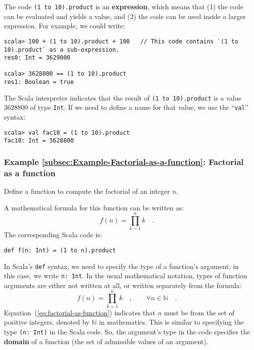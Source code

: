 The code \texttt{}\lstinline!(1 to 10).product! is an \textbf{expression},
which means that (1) the code can be evaluated and yields a value,
and (2) the code can be used inside a larger expression. For example,
we could write:
\begin{lstlisting}
scala> 100 + (1 to 10).product + 100   // This code contains `(1 to 10).product` as a sub-expression.
res0: Int = 3629000

scala> 3628800 == (1 to 10).product 
res1: Boolean = true
\end{lstlisting}
The Scala interpreter indicates that the result of \texttt{}\lstinline!(1 to 10).product!
is a value $3628800$ of type \lstinline!Int!. If we need to define
a name for that value, we use the \textsf{``}\lstinline!val!\textsf{''} syntax:
\begin{lstlisting}
scala> val fac10 = (1 to 10).product
fac10: Int = 3628800
\end{lstlisting}


\subsubsection{Example \label{subsec:Example-Factorial-as-a-function}\ref{subsec:Example-Factorial-as-a-function}:
Factorial as a function}

Define a function to compute the factorial of an integer $n$.

A mathematical formula for this function can be written as:
\[
f\left(n\right)=\prod_{k=1}^{n}k\quad.
\]
The corresponding Scala code is:
\begin{lstlisting}
def f(n: Int) = (1 to n).product
\end{lstlisting}

In Scala\textsf{'}s \texttt{}\lstinline!def! syntax, we need to specify the
type of a function\textsf{'}s argument; in this case, we write \lstinline!n: Int!.
In the usual mathematical notation, types of function arguments are
either not written at all, or written separately from the formula:
\begin{equation}
f(n)=\prod_{k=1}^{n}k\quad,\quad\quad\forall n\in\mathbb{N}\quad.\label{eq:factorial-as-function}
\end{equation}
Equation~(\ref{eq:factorial-as-function}) indicates that $n$ must
be from the set of positive integers, denoted by $\mathbb{N}$ in
mathematics. This is similar to specifying the type \texttt{(}\lstinline!n: Int!\texttt{)}
in the Scala code. So, the argument\textsf{'}s type in the code specifies the
\textbf{domain} of a function (the set
of admissible values of an argument).


